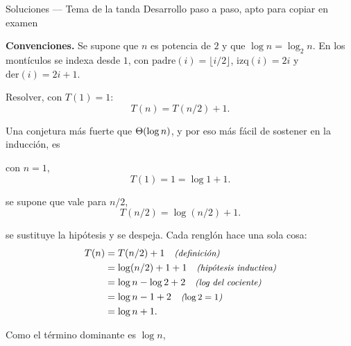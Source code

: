 

\encabezadoSoluciones
  {Soluciones --- Tema de la tanda}
  {Desarrollo paso a paso, apto para copiar en examen}

\noindent\textbf{Convenciones.} Se supone que $n$ es potencia de $2$ y
que $\log n = \log_2 n$. En los montículos se indexa desde $1$, con
$\mathrm{padre}(i) = \lfloor i/2 \rfloor$, $\mathrm{izq}(i) = 2i$ y
$\mathrm{der}(i) = 2i + 1$.




\noindent Resolver, con $T(1) = 1$:
\[
  T(n) = T(n/2) + 1.
\]

Una conjetura más fuerte que $\Theta\!\left(\log n\right)$, y por eso más fácil de
sostener en la inducción, es

 con $n = 1$,
\[
  T(1) = 1 = \log 1 + 1.
\]

 se supone que vale para $n/2$,
\[
  T(n/2) = \log(n/2) + 1.
\]

 se sustituye la hipótesis y se despeja. Cada
renglón hace una sola cosa:
\begin{align*}
  T(n) &= T(n/2) + 1      \quad\text{\small\itshape (definición)} \\
       &= \log(n/2) + 1 + 1 \quad\text{\small\itshape (hipótesis inductiva)} \\
       &= \log n - \log 2 + 2 \quad\text{\small\itshape (log del cociente)} \\
       &= \log n - 1 + 2    \quad\text{\small\itshape ($\log 2 = 1$)} \\
       &= \log n + 1.
\end{align*}

Como el término dominante es $\log n$,


